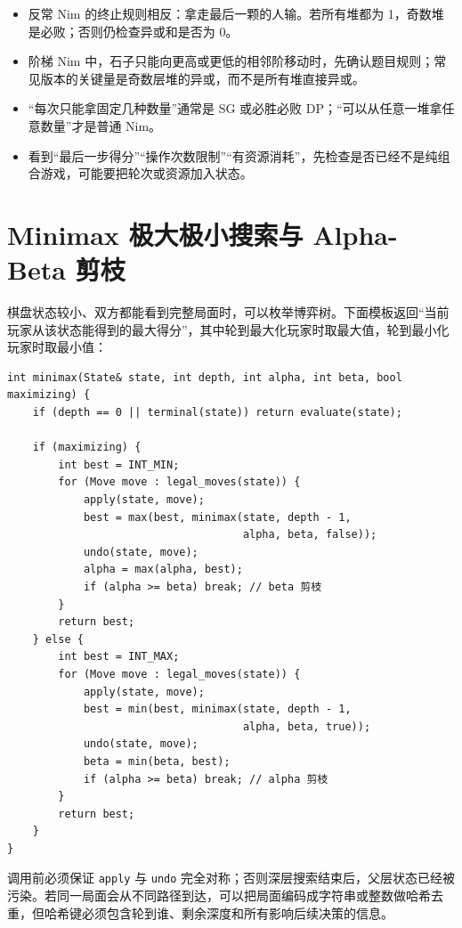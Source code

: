 \documentclass[UTF8,openany,oneside,zihao=-4]{ctexbook}
\begin{document}
\begin{itemize}
  \item 反常 Nim 的终止规则相反：拿走最后一颗的人输。若所有堆都为 1，奇数堆是必败；否则仍检查异或和是否为 0。
  \item 阶梯 Nim 中，石子只能向更高或更低的相邻阶移动时，先确认题目规则；常见版本的关键量是奇数层堆的异或，而不是所有堆直接异或。
  \item “每次只能拿固定几种数量”通常是 SG 或必胜必败 DP；“可以从任意一堆拿任意数量”才是普通 Nim。
  \item 看到“最后一步得分”“操作次数限制”“有资源消耗”，先检查是否已经不是纯组合游戏，可能要把轮次或资源加入状态。
\end{itemize}

\section{Minimax 极大极小搜索与 Alpha-Beta 剪枝}

棋盘状态较小、双方都能看到完整局面时，可以枚举博弈树。下面模板返回“当前玩家从该状态能得到的最大得分”，其中轮到最大化玩家时取最大值，轮到最小化玩家时取最小值：

\begin{lstlisting}
int minimax(State& state, int depth, int alpha, int beta, bool maximizing) {
    if (depth == 0 || terminal(state)) return evaluate(state);

    if (maximizing) {
        int best = INT_MIN;
        for (Move move : legal_moves(state)) {
            apply(state, move);
            best = max(best, minimax(state, depth - 1,
                                     alpha, beta, false));
            undo(state, move);
            alpha = max(alpha, best);
            if (alpha >= beta) break; // beta 剪枝
        }
        return best;
    } else {
        int best = INT_MAX;
        for (Move move : legal_moves(state)) {
            apply(state, move);
            best = min(best, minimax(state, depth - 1,
                                     alpha, beta, true));
            undo(state, move);
            beta = min(beta, best);
            if (alpha >= beta) break; // alpha 剪枝
        }
        return best;
    }
}
\end{lstlisting}

调用前必须保证 \lstinline|apply| 与 \lstinline|undo| 完全对称；否则深层搜索结束后，父层状态已经被污染。若同一局面会从不同路径到达，可以把局面编码成字符串或整数做哈希去重，但哈希键必须包含轮到谁、剩余深度和所有影响后续决策的信息。
\end{document}
